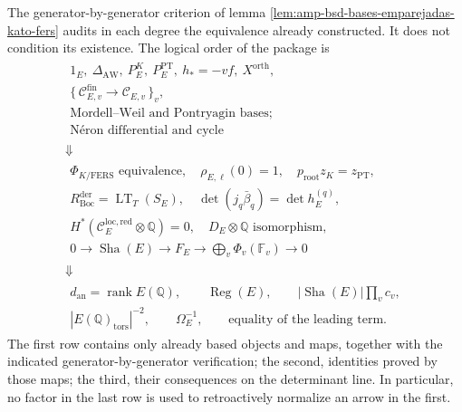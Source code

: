 The generator-by-generator criterion of
lemma \ref{lem:amp-bsd-bases-emparejadas-kato-fers} audits in each degree the
equivalence already constructed. It does not condition its existence. The logical order
of the package is
\begin{equation}\label{eq:amp-bsd-diagrama-causal}
\begin{array}{c}
 \begin{gathered}
  1_E,\ \Delta_{\mathrm{AW}},\ P_E^K,\ P_E^{\mathrm{PT}},
  \ h_*=-vf,\ X^{\mathrm{orth}},\\
  \{\,\mathcal C_{E,v}^{\mathrm{fin}}\to\mathcal C_{E,v}\,\}_v,\\
  \text{Mordell--Weil and Pontryagin bases;}\\
  \text{Néron differential and cycle}
 \end{gathered}
 \\[2mm]\Downarrow\\[-1mm]
 \begin{gathered}
  \Phi_{K/\mathrm{FERS}}\text{ equivalence},\quad
  \rho_{E,\ell}(0)=1,\quad
  p_{\mathrm{root}}z_K=z_{\mathrm{PT}},\\
  R_{\mathrm{Boc}}^{\mathrm{der}}=\operatorname{LT}_T(S_E),\quad
  \det(j_q\bar\beta_q)=\det h_E^{(q)},\\
  H^*(\mathcal C_E^{\mathrm{loc,red}}\otimes\mathbb Q)=0,\quad
  D_E\otimes\mathbb Q\text{ isomorphism},\\
  0\to\operatorname{Sha}(E)\to F_E
  \to\bigoplus_v\Phi_v(\mathbb F_v)\to0
 \end{gathered}
 \\[2mm]\Downarrow\\[-1mm]
 \begin{gathered}
  d_{\mathrm{an}}=\operatorname{rank}E(\mathbb Q),\qquad
  \operatorname{Reg}(E),\qquad
  |\operatorname{Sha}(E)|\prod_vc_v,\\
  |E(\mathbb Q)_{\mathrm{tors}}|^{-2},\qquad
  \Omega_E^{-1},\qquad
  \text{equality of the leading term}.
 \end{gathered}
\end{array}
\end{equation}
The first row contains only already based objects and maps, together with
the indicated generator-by-generator verification; the second, identities
proved by those maps; the third, their consequences on the determinant
line. In particular, no factor in the last row is
used to retroactively normalize an arrow in the first.

